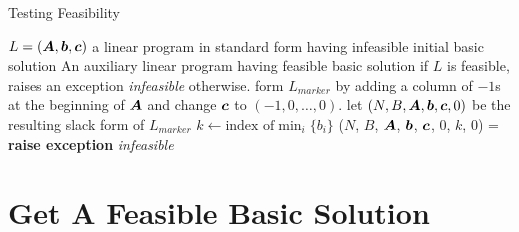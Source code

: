 \documentclass[32pt, aspectratio = 169]{beamer}
\begin{document}
\begin{frame}{Testing Feasibility}
    \setlength\columnseprule{.1pt}
    \begin{multicols}{2}
    \small{
    \begin{algorithmic}[1]
        \Require $L = (\boldsymbol{A}, \boldsymbol{b}, \boldsymbol{c})$ a linear program in standard form having infeasible initial basic solution
        \Ensure An auxiliary linear program having feasible basic solution if $L$ is feasible, raises an exception \textit{infeasible} otherwise.
        \Statex
            \State form $L_{marker}$ by adding a column of $-1$s at the beginning of $\boldsymbol{A}$ and change $\boldsymbol{c}$ to $(-1, 0, \ldots, 0)$.
            \State {}
            \State let $(N, B, \boldsymbol{A}, \boldsymbol{b}, \boldsymbol{c}, 0)$ be the resulting slack form of $L_{marker}$
            \State $k \gets \textrm{index of} \min_i\{b_i\}$
            \State ($N$, $B$, $\boldsymbol{A}$, $\boldsymbol{b}$, $\boldsymbol{c}$, $0$, $k$, $0$) = 
            \State {}
                \State {}
            \Else
                \State \textbf{raise exception} \textit{infeasible}
            \EndIf
            \EndFunction
       \Statex
      \end{algorithmic}
      }
    \end{multicols}
\end{frame}

\section{Get A Feasible Basic Solution}
\end{document}
